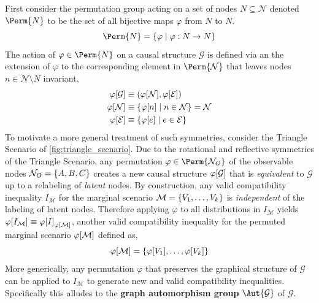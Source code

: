 \documentclass[aps, 10pt, english, twoside, pra, nofootinbib, longbibliography]{revtex4-1}
\theoremstyle{plain}
\theoremstyle{definition}
\newtheorem{example}[theorem]{Example}
\theoremstyle{remark}
\newcommand{\graph}{\mathcal{G}}
\newcommand{\nodes}{\mathcal{N}}
\newcommand{\edges}{\mathcal{E}}
\newcommand{\gelem}{\varphi}
\newcommand{\action}[1]{\gelem\bs{#1}}
\newcommand{\mscenario}{\mathcal{M}}
\newcommand{\term}[1]{\textcolor{Mahogany}{\textbf{#1}}}
\begin{document}
    First consider the permutation group acting on a set of nodes $N \subseteq \nodes$ denoted $\Perm{N}$ to be the set of all bijective maps $\gelem$ from $N$ to $N$.
    \[ \Perm{N} = \bc{\gelem \mid \gelem : N \to N} \]
    The action of $\gelem \in \Perm{N}$ on a causal structure $\graph$ is defined via an the extension of $\gelem$ to the corresponding element in $\Perm{\nodes}$ that leaves nodes $n \in \nodes \setminus N$ invariant,
    \begin{align*}
    \action{\graph} &\defined \br{\action{\nodes}, \action{\edges}} \\
    \action{\nodes} &\defined \bc{\action{n} \mid n \in \nodes} = \nodes \\
    \action{\edges} &\defined \bc{\action{e} \mid e \in \edges}
    \end{align*}
    To motivate a more general treatment of such symmetries, consider the Triangle Scenario of \cref{fig:triangle_scenario}. Due to the rotational and reflective symmetries of the Triangle Scenario, any permutation $\gelem \in \Perm{\nodes_O}$ of the observable nodes $\nodes_O = \bc{A, B, C}$ creates a new causal structure $\action{\graph}$ that is \textit{equivalent} to $\graph$ up to a relabeling of \textit{latent} nodes. By construction, any valid compatibility inequality $I_{\mscenario}$ for the marginal scenario $\mscenario = \bc{V_1, \ldots, V_k}$ is \textit{independent} of the labeling of latent nodes. Therefore applying $\gelem$ to all distributions in $I_{\mscenario}$ yields $\action{I_{\mscenario}} \defined \action{I}_{\action{\mscenario}}$, another valid compatibility inequality for the permuted marginal scenario $\action{\mscenario}$ defined as,
    \[ \action{\mscenario} = \bc{\action{V_1}, \ldots, \action{V_k}} \]
    More generically, any permutation $\gelem$ that preserves the graphical structure of $\graph$ can be applied to $I_{\mscenario}$ to generate new and valid compatibility inequalities. Specifically this alludes to the \term{graph automorphism group} $\Aut{\graph}$ of $\graph$.
\end{document}
